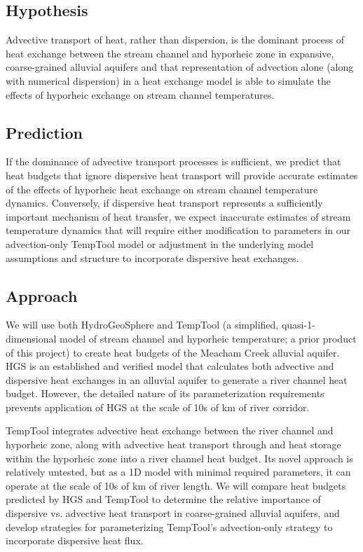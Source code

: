 \documentclass[a4paper]{article}
\begin{document}
\subsection*{Hypothesis}
Advective transport of heat, rather than dispersion, is the dominant process of heat exchange between the stream channel and hyporheic zone in expansive, coarse-grained alluvial aquifers and that representation of advection alone (along with numerical dispersion) in a heat exchange model is able to simulate the effects of hyporheic exchange on stream channel temperatures.

\subsection*{Prediction}
If the dominance of advective transport processes is sufficient, we predict that heat budgets that ignore dispersive heat transport will provide accurate estimates of the effects of hyporheic heat exchange on stream channel temperature dynamics. Conversely, if dispersive heat transport represents a sufficiently important mechanism of heat transfer, we expect inaccurate estimates of stream temperature dynamics that will require either modification to parameters in our advection-only TempTool model or adjustment in the underlying model assumptions and structure to incorporate dispersive heat exchanges.




\subsection*{Approach}
We will use both HydroGeoSphere and TempTool (a simplified, quasi-1-dimensional model of stream channel and hyporheic temperature; a prior product of this project) to create heat budgets of the Meacham Creek alluvial aquifer. HGS is an established and verified model that calculates both advective and dispersive heat exchanges in an alluvial aquifer to generate a river channel heat budget. However, the detailed nature of its parameterization requirements prevents application of HGS at the scale of 10s of km of river corridor. 

TempTool integrates advective heat exchange between the river channel and hyporheic zone, along with advective heat transport through and heat storage within the hyporheic zone into a river channel heat budget.  Its novel approach is relatively untested, but as a 1D model with minimal required parameters, it can operate at the scale of 10s of km of river length.  We will compare heat budgets predicted by HGS and TempTool to determine the relative importance of dispersive vs. advective heat transport in coarse-grained alluvial aquifers, and develop strategies for parameterizing TempTool’s advection-only strategy to incorporate dispersive heat flux. 
\end{document}
